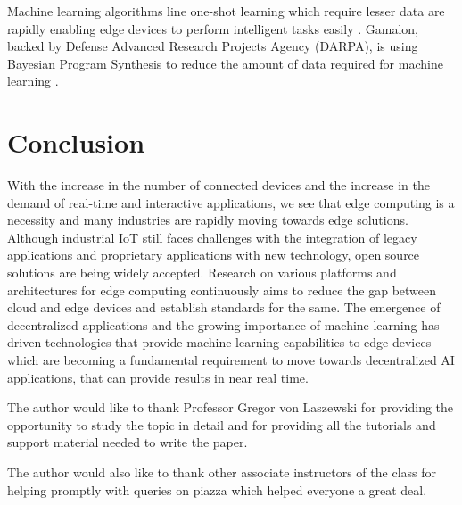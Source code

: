 \documentclass[sigconf]{acmart}
\begin{document}
Machine learning algorithms line one-shot learning which require lesser data are rapidly enabling edge devices to perform intelligent tasks easily \cite{wiki-one-shot-learning}.
Gamalon, backed by Defense Advanced Research Projects Agency (DARPA), is using Bayesian Program Synthesis to reduce the amount of data required for machine learning \cite{ai-to-edge}. 

\section{Conclusion}
With the increase in the number of connected devices and the increase in the demand of real-time and interactive applications, we see that edge computing is a necessity and many industries are rapidly moving towards edge solutions. Although industrial IoT still faces challenges with the integration of legacy applications and proprietary applications with new technology, open source solutions are being widely accepted. Research on various platforms and architectures for edge computing continuously aims to reduce the gap between cloud and edge devices and establish standards for the same. The emergence of decentralized applications and the growing importance of machine learning has driven technologies that provide machine learning capabilities to edge devices which are becoming a fundamental requirement to move towards decentralized AI applications, that can provide results in near real time.

\begin{acks}
The author would like to thank Professor Gregor von Laszewski for providing the opportunity to study the topic in detail and for providing all the tutorials and support material needed to write the paper.

The author would also like to thank other associate instructors of the class for helping promptly with queries on piazza which helped everyone a great deal.
\end{acks}


 
\end{document}
